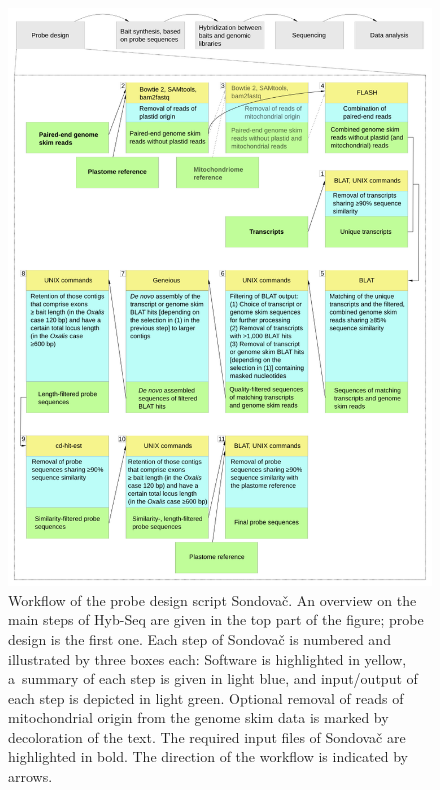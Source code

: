 \documentclass[a4paper, 11pt, twoside]{article}
\begin{document}
\begin{figure}[p]
\begin{center}
\includegraphics[width=14cm]{pipeline_workflow.png}
\end{center}
\caption[Workflow of the probe design script Sondovač]{Workflow of the probe design script Sondovač. An overview on the main steps of Hyb-Seq are given in the top part of the figure; probe design is the first one. Each step of Sondovač is numbered and illustrated by three boxes each: Software is highlighted in yellow, a~summary of each step is given in light blue, and input/output of each step is depicted in light green. Optional removal of reads of mitochondrial origin from the genome skim data is marked by decoloration of the text. The required input files of Sondovač are highlighted in bold. The direction of the workflow is indicated by arrows.}
\label{pipeline-workflow}
\end{figure}
\end{document}

